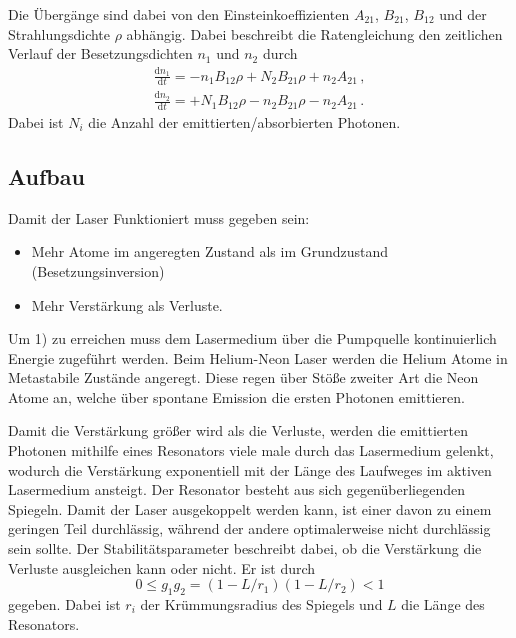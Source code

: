 Die Übergänge sind dabei von den Einsteinkoeffizienten $A_{21}$, $B_{21}$, $B_{12}$ und der Strahlungsdichte $\rho$ abhängig.
Dabei beschreibt die Ratengleichung den zeitlichen Verlauf der Besetzungsdichten $n_1$ und $n_2$ durch
\begin{align*}
	\frac{\mathrm{d}n_1}{\mathrm{d}t} = -n_1 B_{12} \rho + N_2 B_{21} \rho + n_2 A_{21}\,,\\
	\frac{\mathrm{d}n_2}{\mathrm{d}t} = +N_1 B_{12} \rho - n_2 B_{21} \rho - n_2 A_{21}\,.
\end{align*}
Dabei ist $N_i$ die Anzahl der emittierten/absorbierten Photonen.

\subsection{Aufbau} %
\label{sub:aufbau}


Damit der Laser Funktioniert muss gegeben sein:
\begin{itemize}
	\item Mehr Atome im angeregten Zustand als im Grundzustand (Besetzungsinversion)
	\item Mehr Verstärkung als Verluste.
\end{itemize}

Um 1) zu erreichen muss dem Lasermedium über die Pumpquelle kontinuierlich Energie zugeführt werden.
Beim Helium-Neon Laser werden die Helium Atome in Metastabile Zustände angeregt.
Diese regen über Stöße zweiter Art die Neon Atome an, welche über spontane Emission die ersten Photonen emittieren.

Damit die Verstärkung größer wird als die Verluste, werden die emittierten Photonen mithilfe eines Resonators viele male durch das Lasermedium gelenkt, wodurch die Verstärkung exponentiell mit der Länge des Laufweges im aktiven Lasermedium ansteigt.
Der Resonator besteht aus sich gegenüberliegenden Spiegeln.
Damit der Laser ausgekoppelt werden kann, ist einer davon zu einem geringen Teil durchlässig, während der andere optimalerweise nicht durchlässig sein sollte.
Der Stabilitätsparameter beschreibt dabei, ob die Verstärkung die Verluste ausgleichen kann oder nicht. 
Er ist durch 
\begin{equation}
    \label{eqn:stabi}
	0 \leq g_1 g_2 = (1-L/r_1)(1-L/r_2) < 1
\end{equation}
gegeben.
Dabei ist $r_i$ der Krümmungsradius des Spiegels und $L$ die Länge des Resonators.


